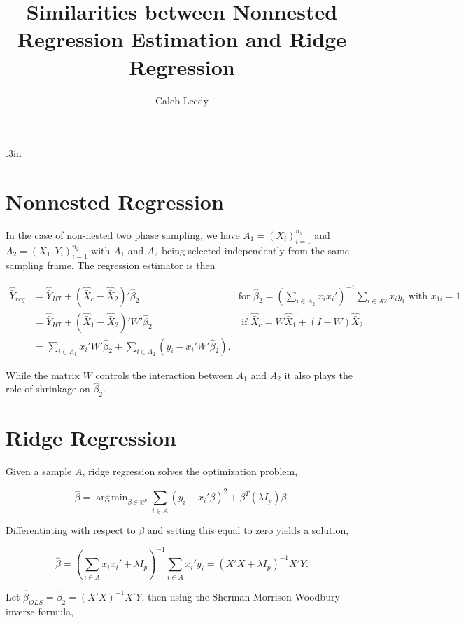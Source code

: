 \documentclass[12pt]{article}
\DeclareMathOperator*{\argmin}{arg\,min}
\newcommand{\R}{\mathbb{R}}
\begin{document}
\title{Similarities between Nonnested Regression Estimation and Ridge Regression}
\author{Caleb Leedy}
\maketitle 

\baselineskip .3in

\section{Nonnested Regression}

In the case of non-nested two phase sampling, we have $A_1 = (X_i)_{i = 1}^{n_1}$
and $A_2 = (X_1, Y_i)_{i = 1}^{n_2}$ with $A_1$ and $A_2$ being selected
independently from the same sampling frame. The regression estimator is then

\begin{align*}
\hat{\bar{Y}}_{reg} 
  &= \hat{\bar{Y}}_{HT} + (\hat{\bar{X}}_c - \hat{\bar{X}}_2)' \hat \beta_2 
  & \text{for } \hat \beta_2 = \left(\sum_{i \in A_2} x_i x_i'\right)^{-1} 
    \sum_{i \in A2} x_i y_i \text{ with } x_{1i} = 1 \\
  &= \hat{\bar{Y}}_{HT} + (\hat{\bar{X}}_1 - \hat{\bar{X}}_2)'W'\hat \beta_2 
  & \text{ if } \hat{\bar{X}}_c = W \hat{\bar{X}}_1 + (I - W) \hat{\bar{X}}_2\\
  &= \sum_{i \in A_1} x_i' W' \hat \beta_2 + \sum_{i \in A_2} (y_i - x_i' W'
  \hat \beta_2).
\end{align*}

While the matrix $W$ controls the interaction between $A_1$ and $A_2$ it also
plays the role of shrinkage on $\hat \beta_2$.

\section{Ridge Regression}

Given a sample $A$, ridge regression solves the optimization problem,

$$\hat \beta = \argmin_{\beta \in \R^p} \sum_{i \in A} (y_i - x_i'\beta)^2 + \beta^T
(\lambda I_p) \beta.$$

Differentiating with respect to $\beta$ and setting this equal to zero yields a
solution,

$$\hat \beta = \left(\sum_{i \in A} x_i x_i' + \lambda I_p\right)^{-1} \sum_{i
\in A} x_i' y_i = (X'X + \lambda I_p)^{-1} X'Y.$$

Let $\hat \beta_{OLS} = \hat \beta_2 = (X'X)^{-1} X'Y$, then using the
Sherman-Morrison-Woodbury inverse formula,
\end{document}

